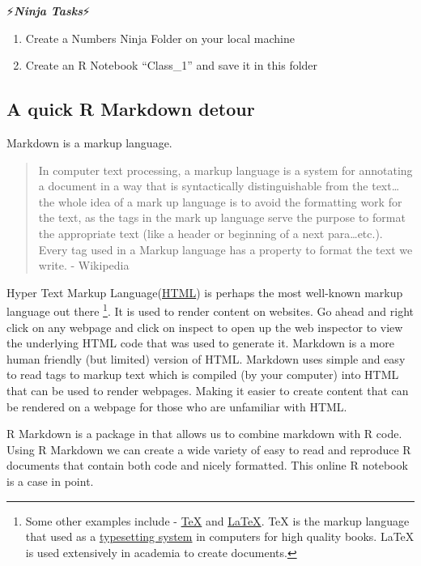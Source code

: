 \documentclass[]{article}
\providecommand{\tightlist}{%
  \setlength{\itemsep}{0pt}\setlength{\parskip}{0pt}}
\let\rmarkdownfootnote\footnote%
\def\footnote{\protect\rmarkdownfootnote}
\begin{document}
⚡\textbf{\emph{Ninja Tasks}}⚡

\begin{enumerate}
\def\labelenumi{\arabic{enumi}.}
\tightlist
\item
  Create a Numbers Ninja Folder on your local machine
\item
  Create an R Notebook ``Class\_1'' and save it in this folder
\end{enumerate}

\subsection{A quick R Markdown detour}\label{a-quick-r-markdown-detour}

Markdown is a markup language.

\begin{quote}
In computer text processing, a markup language is a system for
annotating a document in a way that is syntactically distinguishable
from the text\ldots{}the whole idea of a mark up language is to avoid
the formatting work for the text, as the tags in the mark up language
serve the purpose to format the appropriate text (like a header or
beginning of a next para\ldots{}etc.). Every tag used in a Markup
language has a property to format the text we write. - Wikipedia
\end{quote}

{Hyper Text Markup
Language}(\href{https://en.wikipedia.org/wiki/HTML}{HTML}) is perhaps
the most well-known markup language out there \footnote{Some other
  examples include - \href{https://en.wikipedia.org/wiki/TeX}{TeX} and
  \href{https://en.wikipedia.org/wiki/LaTeX}{LaTeX}. TeX is the markup
  language that used as a
  \href{https://en.wikipedia.org/wiki/Typesetting}{typesetting system}
  in computers for high quality books. LaTeX is used extensively in
  academia to create documents.}. It is used to render content on
websites. Go ahead and right click on any webpage and click on inspect
to open up the web inspector to view the underlying HTML code that was
used to generate it. {Markdown} is a more human friendly (but limited)
version of HTML. Markdown uses simple and easy to read tags to markup
text which is compiled (by your computer) into HTML that can be used to
render webpages. Making it easier to create content that can be rendered
on a webpage for those who are unfamiliar with HTML.

{R Markdown} is a package in that allows us to combine markdown with R
code. Using R Markdown we can create a wide variety of easy to read and
reproduce R documents that contain both code and nicely formatted. This
online R notebook is a case in point.
\end{document}

